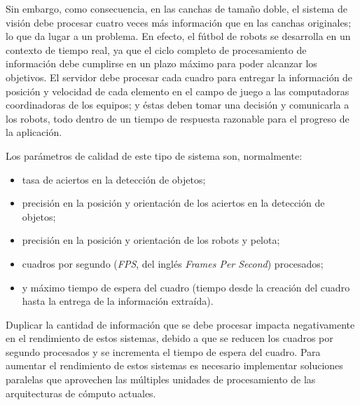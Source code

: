Sin embargo, como consecuencia, en las canchas de tamaño doble, el sistema de
visión debe procesar cuatro veces más información que en las canchas originales;
lo que da lugar a un problema. En efecto, el fútbol de robots se desarrolla en
un contexto de tiempo real, ya que el ciclo completo de procesamiento de
información debe cumplirse en un plazo máximo para poder alcanzar los objetivos.
El servidor debe procesar cada cuadro para entregar la información de posición y
velocidad de cada elemento en el campo de juego a las computadoras coordinadoras
de los equipos; y éstas deben tomar una decisión y comunicarla a los robots,
todo dentro de un tiempo de respuesta razonable para el progreso de la
aplicación.

Los parámetros de calidad de este tipo de sistema son, normalmente:

\begin{itemize}

	\item 	tasa de aciertos en la detección de objetos;

	\item 	precisión en la posición y orientación de los aciertos en la
		detección de objetos;

	\item 	precisión en la posición y orientación de los robots y pelota;

	\item 	cuadros por segundo (\emph{FPS}, del inglés \emph{Frames Per
		Second}) procesados;

	\item 	y máximo tiempo de espera del cuadro (tiempo desde la creación
		del cuadro hasta la entrega de la información extraída).

\end{itemize}

Duplicar la cantidad de información que se debe procesar impacta negativamente
en el rendimiento de estos sistemas, debido a que se reducen los cuadros por
segundo procesados y se incrementa el tiempo de espera del cuadro. Para aumentar
el rendimiento de estos sistemas es necesario implementar soluciones paralelas
que aprovechen las múltiples unidades de procesamiento de las arquitecturas de
cómputo actuales.
